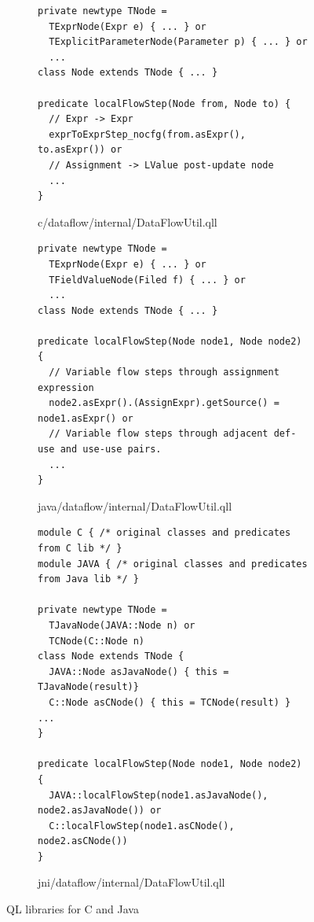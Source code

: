 \begin{figure}[hbt!]
  \centering
  \begin{subfigure}{0.94\textwidth}
\begin{lstlisting}[style=codeql,xleftmargin=2.5em]
private newtype TNode =
  TExprNode(Expr e) { ... } or
  TExplicitParameterNode(Parameter p) { ... } or
  ...
class Node extends TNode { ... }

predicate localFlowStep(Node from, Node to) {
  // Expr -> Expr
  exprToExprStep_nocfg(from.asExpr(), to.asExpr()) or
  // Assignment -> LValue post-update node
  ...
}
\end{lstlisting}
    \vspace*{-.5em}
    \caption{\normalsize c/dataflow/internal/DataFlowUtil.qll}
    \label{fig:qll1}
  \end{subfigure}
  \begin{subfigure}{0.94\textwidth}
\begin{lstlisting}[style=codeql,xleftmargin=2.5em]
private newtype TNode =
  TExprNode(Expr e) { ... } or
  TFieldValueNode(Filed f) { ... } or
  ...
class Node extends TNode { ... }

predicate localFlowStep(Node node1, Node node2) {
  // Variable flow steps through assignment expression
  node2.asExpr().(AssignExpr).getSource() = node1.asExpr() or
  // Variable flow steps through adjacent def-use and use-use pairs.
  ...
}
\end{lstlisting}
    \vspace*{-.5em}
    \caption{\normalsize java/dataflow/internal/DataFlowUtil.qll}
    \label{fig:qll2}
  \end{subfigure}
  \begin{subfigure}{0.94\textwidth}
\begin{lstlisting}[style=codeql,xleftmargin=2.5em]
module C { /* original classes and predicates from C lib */ }
module JAVA { /* original classes and predicates from Java lib */ }

private newtype TNode =
  TJavaNode(JAVA::Node n) or
  TCNode(C::Node n)
class Node extends TNode {
  JAVA::Node asJavaNode() { this = TJavaNode(result)}
  C::Node asCNode() { this = TCNode(result) } ...
}

predicate localFlowStep(Node node1, Node node2) {
  JAVA::localFlowStep(node1.asJavaNode(), node2.asJavaNode()) or
  C::localFlowStep(node1.asCNode(), node2.asCNode())
}
\end{lstlisting}
    \vspace*{-.5em}
    \caption{\normalsize jni/dataflow/internal/DataFlowUtil.qll}
    \label{fig:qll3}
  \end{subfigure}
  \vspace*{-.5em}
  \caption{QL libraries for C and Java}
  \label{fig:qll}
\end{figure}

